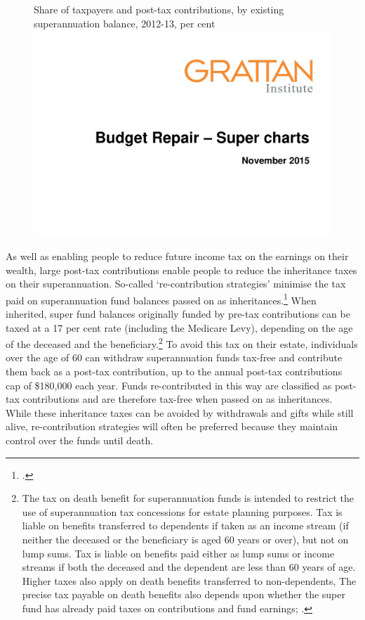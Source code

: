 \begin{figure}
%
{Share of taxpayers and post-tax contributions, by existing superannuation balance, 2012-13, per cent}
\includegraphics[width=\columnwidth,page=30]{super-atlas/PPTX.pdf}
\end{figure}

As well as enabling people to reduce future income tax on the earnings on their wealth, large post-tax contributions enable people to reduce the inheritance taxes on their superannuation. So-called ‘re-contribution strategies’ minimise the tax paid on superannuation fund balances passed on as inheritances.\footcite[][26]{RiceWarner2015SubmissionFSI}  When inherited, super fund balances originally funded by pre-tax contributions can be taxed at a 17 per cent rate (including the Medicare Levy), depending on the age of the deceased and the beneficiary.\footnote{The tax on death benefit for superannuation funds is intended to restrict the use of superannuation tax concessions for estate planning purposes. Tax is liable on benefits transferred to dependents if taken as an income stream (if neither the deceased or the beneficiary is aged 60 years or over), but not on lump sums. Tax is liable on benefits paid either as lump sums or income streams if both the deceased and the dependent are less than 60 years of age. Higher taxes also apply on death benefits transferred to non-dependents, The precise tax payable on death benefits also depends upon whether the super fund has already paid taxes on contributions and fund earnings; \textcite{ATO2015DeathBenefits}.}  To avoid this tax on their estate, individuals over the age of 60 can withdraw superannuation funds tax-free and contribute them back as a post-tax contribution, up to the annual post-tax contributions cap of \$180,000 each year. Funds re-contributed in this way are classified as post-tax contributions and are therefore tax-free when passed on as inheritances. While these inheritance taxes can be avoided by withdrawals and gifts while still alive, re-contribution strategies will often be preferred because they maintain control over the funds until death.

